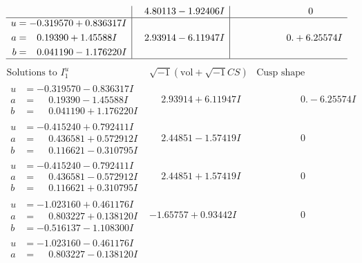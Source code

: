 \documentclass[1p]{elsarticle_modified}
\theoremstyle{definition}
\newcommand{\I}{\sqrt{-1}}
\begin{document}
$$\begin{array}{c|c|c}
 & \phantom{-}4.80113 - 1.92406 I & \phantom{-0.000000 } 0 \\ \hline\begin{aligned}
u &= -0.319570 + 0.836317 I \\
a &= \phantom{-}0.19390 + 1.45588 I \\
b &= \phantom{-}0.041190 - 1.176220 I\end{aligned}
 & \phantom{-}2.93914 - 6.11947 I & \phantom{-0.000000 -}0. + 6.25574 I\\
 \hline 
 \end{array}$$\newpage$$\begin{array}{c|c|c}  
\text{Solutions to }I^u_{1}& \I (\text{vol} + \sqrt{-1}CS) & \text{Cusp shape}\\
 \hline 
\begin{aligned}
u &= -0.319570 - 0.836317 I \\
a &= \phantom{-}0.19390 - 1.45588 I \\
b &= \phantom{-}0.041190 + 1.176220 I\end{aligned}
 & \phantom{-}2.93914 + 6.11947 I & \phantom{-0.000000 } 0. - 6.25574 I \\ \hline\begin{aligned}
u &= -0.415240 + 0.792411 I \\
a &= \phantom{-}0.436581 + 0.572912 I \\
b &= \phantom{-}0.116621 - 0.310795 I\end{aligned}
 & \phantom{-}2.44851 - 1.57419 I & \phantom{-0.000000 } 0 \\ \hline\begin{aligned}
u &= -0.415240 - 0.792411 I \\
a &= \phantom{-}0.436581 - 0.572912 I \\
b &= \phantom{-}0.116621 + 0.310795 I\end{aligned}
 & \phantom{-}2.44851 + 1.57419 I & \phantom{-0.000000 } 0 \\ \hline\begin{aligned}
u &= -1.023160 + 0.461176 I \\
a &= \phantom{-}0.803227 + 0.138120 I \\
b &= -0.516137 - 1.108300 I\end{aligned}
 & -1.65757 + 0.93442 I & \phantom{-0.000000 } 0 \\ \hline\begin{aligned}
u &= -1.023160 - 0.461176 I \\
a &= \phantom{-}0.803227 - 0.138120 I \\

\end{aligned}
\end{array}$$
\end{document}
